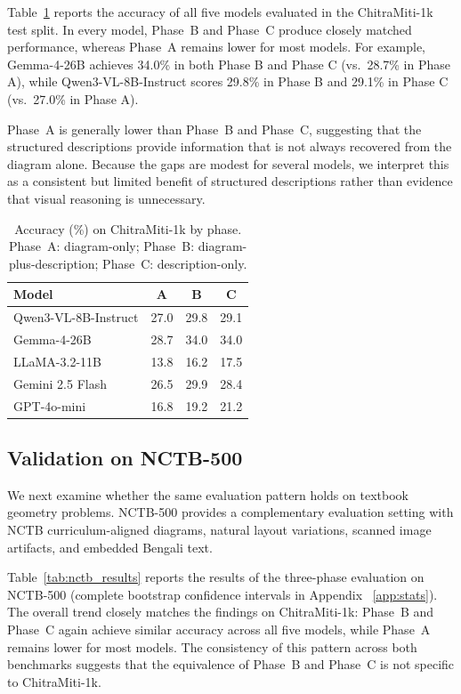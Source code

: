 \documentclass[11pt]{article}
\begin{document}
Table~\ref{tab:chitramiti_results} reports the accuracy of all five models evaluated in the ChitraMiti-1k test split. In every model, Phase~B and Phase~C produce closely matched performance, whereas Phase~A remains lower for most models. For example, Gemma-4-26B achieves 34.0\% in both Phase B and Phase C (vs.\ 28.7\% in Phase A), while Qwen3-VL-8B-Instruct scores 29.8\% in Phase B and 29.1\% in Phase C (vs.\ 27.0\% in Phase A).

Phase~A is generally lower than Phase~B and Phase~C, suggesting that the structured descriptions provide information that is not always recovered from the diagram alone. Because the gaps are modest for several models, we interpret this as a consistent but limited benefit of structured descriptions rather than evidence that visual reasoning is unnecessary.

\begin{table}[t]
\centering\small
\begin{tabular}{lccc}
\toprule
Model & A & B & C \\
\midrule
Qwen3-VL-8B-Instruct & 27.0 & 29.8 & 29.1 \\
Gemma-4-26B & 28.7 & 34.0 & 34.0 \\
LLaMA-3.2-11B & 13.8 & 16.2 & 17.5 \\
Gemini 2.5 Flash & 26.5 & 29.9 & 28.4 \\
GPT-4o-mini & 16.8 & 19.2 & 21.2 \\
\bottomrule
\end{tabular}
\caption{Accuracy (\%) on ChitraMiti-1k by phase. Phase~A: diagram-only; Phase~B: diagram-plus-description; Phase~C: description-only.}
\label{tab:chitramiti_results}
\end{table}

\subsection{Validation on NCTB-500}
\label{ssec:nctb_results}

We next examine whether the same evaluation pattern holds on textbook geometry problems. NCTB-500 provides a complementary evaluation setting with NCTB curriculum-aligned diagrams, natural layout variations, scanned image artifacts, and embedded Bengali text.

Table~\ref{tab:nctb_results} reports the results of the three-phase evaluation on NCTB-500 (complete bootstrap confidence intervals in Appendix~ \ref{app:stats}). The overall trend closely matches the findings on ChitraMiti-1k: Phase~B and Phase~C again achieve similar accuracy across all five models, while Phase~A remains lower for most models. The consistency of this pattern across both benchmarks suggests that the equivalence of Phase~B and Phase~C is not specific to ChitraMiti-1k.
\end{document}
